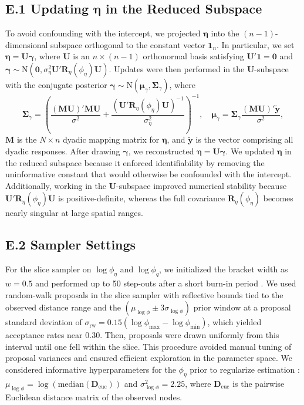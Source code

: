 \documentclass{article}
\begin{document}
\subsection*{E.1 Updating $\boldsymbol{\eta}$ in the Reduced Subspace}
To avoid confounding with the intercept, we projected $\boldsymbol{\eta}$ into the $(n-1)$-dimensional subspace orthogonal to the constant vector $\mathbf{1}_n$.
In particular, we set $\boldsymbol{\eta}=\mathbf{U}\boldsymbol{\gamma}$, where $\mathbf{U}$ is an $n\times(n-1)$ orthonormal basis satisfying $\mathbf{U}'\mathbf{1}=\mathbf{0}$ and $\boldsymbol\gamma\sim\text{N}(\boldsymbol0,\sigma^2_\eta\mathbf{U}'\mathbf{R}_\eta(\phi_\eta)\mathbf{U})$. Updates were then performed in the $\mathbf{U}$-subspace with the conjugate posterior $\boldsymbol\gamma \sim \text{N}(\boldsymbol\mu_\gamma,\boldsymbol\Sigma_\gamma)$, where $$\boldsymbol\Sigma_\gamma=\left(\frac{(\mathbf{MU})'\mathbf{MU}}{\sigma^2}+\frac{(\mathbf{U}'\mathbf{R}_\eta(\phi_\eta)\mathbf{U})^{-1}}{\sigma^2_\eta}\right)^{-1},\quad \boldsymbol\mu_\gamma=\boldsymbol\Sigma_\gamma\frac{(\mathbf{MU})'\widetilde{\mathbf{y}}}{\sigma^2},$$
$\mathbf{M}$ is the $N \times n$ dyadic mapping matrix for $\boldsymbol\eta$, and $\widetilde{\mathbf{y}}$ is the vector comprising all dyadic responses.
After drawing $\boldsymbol{\gamma}$, we reconstructed $\boldsymbol{\eta}=\mathbf{U}\boldsymbol{\gamma}$. We updated $\boldsymbol\eta$ in the reduced subspace because it enforced identifiability by removing the uninformative constant that would otherwise be confounded with the intercept. Additionally, working in the $\mathbf{U}$-subspace improved numerical stability because $\mathbf{U}'\mathbf{R}_\eta(\phi_\eta)\mathbf{U}$ is positive-definite, whereas the full covariance $\mathbf{R}_\eta(\phi_\eta)$ becomes nearly singular at large spatial ranges.

\subsection*{E.2 Sampler Settings}
For the slice sampler on $\log\phi_\eta$ and $\log\phi_q$, we initialized the bracket width as $w=0.5$ and performed up to 50 step-outs after a short burn-in period \citep{neal2003slice}.
We used random-walk proposals in the slice sampler with reflective bounds tied to the observed distance range and the $(\mu_{\log\phi}\pm 3\sigma_{\log\phi})$ prior window at a proposal standard deviation of $\sigma_{\text{rw}}=0.15(\log\phi_{\max}-\log\phi_{\min})$, which yielded acceptance rates near 0.30.  
Then, proposals were drawn uniformly from this interval until one fell within the slice. 
This procedure avoided manual tuning of proposal variances and ensured efficient exploration in the parameter space. We considered informative hyperparameters for the $\phi_\eta$ prior to regularize estimation \citep{zhang2004inconsistent}: $\mu_{\log\phi}=\log(\text{median}(\mathbf{D}_{\text{euc}}))$ and $\sigma^2_{\log\phi}=2.25$, where $\mathbf{D}_{\text{euc}}$ is the pairwise Euclidean distance matrix of the observed nodes.
\end{document}
